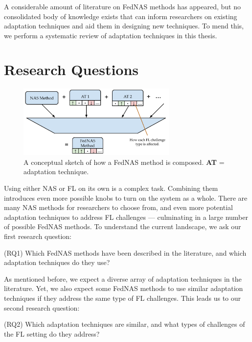 A considerable amount of literature on FedNAS methods has appeared, but no consolidated body of knowledge exists that can inform researchers on existing adaptation techniques and aid them in designing new techniques. To mend this, we perform a systematic review of adaptation techniques in this thesis. 

\section{Research Questions}

\begin{figure}[htbp]
  \centering
  \includegraphics[width=0.7\textwidth]{figures/fednas_method_composition.pdf}
  \caption{A conceptual sketch of how a FedNAS method is composed. \textbf{AT} = adaptation technique.}
  \label{fig:fednas_method_composition}
\end{figure}

Using either NAS or FL on its own is a complex task. Combining them introduces even more possible knobs to turn on the system as a whole. There are many NAS methods for researchers to choose from, and even more potential adaptation techniques to address FL challenges — culminating in a large number of possible FedNAS methods. To understand the current landscape, we ask our first research question:

\vspace{1em}
(RQ1) Which FedNAS methods have been described in the literature, and which adaptation techniques do they use?
\vspace{1em}

As mentioned before, we expect a diverse array of adaptation techniques in the literature. Yet, we also expect some FedNAS methods to use similar adaptation techniques if they address the same type of FL challenges. This leads us to our second research question:

\vspace{1em}
(RQ2) Which adaptation techniques are similar, and what types of challenges of the FL setting do they address?
\vspace{1em}

